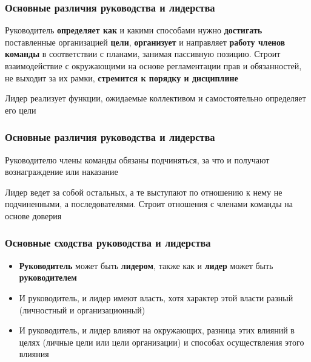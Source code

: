 \documentclass{../industrial-development}
\begin{document}
\begin{frame} \frametitle{Основные различия руководства и лидерства}
\begin{block}{}
Руководитель \textbf{определяет как} и какими способами нужно \textbf{достигать} поставленные организацией \textbf{цели}, \textbf{организует} и направляет \textbf{работу членов команды} в соответствии с планами, занимая  пассивную позицию. Строит взаимодействие с окружающими на основе регламентации прав и обязанностей, не выходит за их рамки, \textbf{стремится к порядку и дисциплине}
\end{block}

\begin{block}{}
Лидер реализует функции, ожидаемые коллективом и самостоятельно определяет его цели
\end{block}

\end{frame}

\begin{frame} \frametitle{Основные различия руководства и лидерства}
\begin{block}{}
Руководителю члены команды обязаны подчиняться, за что и получают вознаграждение или наказание
\end{block}

\begin{block}{}
Лидер ведет за собой остальных, а те выступают по отношению к нему не подчиненными, а последователями. Строит отношения с членами команды на основе доверия
\end{block}

\end{frame}


\begin{frame} \frametitle{Основные сходства руководства и лидерства}

\begin{itemize}
	\item \textbf{Руководитель} может быть \textbf{лидером}, также как и \textbf{лидер} может быть \textbf{руководителем}
	\item И руководитель, и лидер имеют власть, хотя характер этой власти разный (личностный и организационный)
	\item И руководитель, и лидер влияют на окружающих, разница этих влияний в целях (личные цели или цели организации) и способах осуществления этого влияния
	
\end{itemize}

\end{frame}
\end{document}
